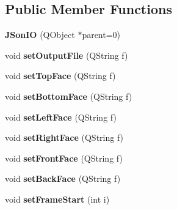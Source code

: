\subsection*{\-Public \-Member \-Functions}
\begin{DoxyCompactItemize}
\item 
\hypertarget{class_j_son_i_o_a79e07c1b5210823a0758985d6a413ed1}{
{\bfseries \-J\-Son\-I\-O} (\-Q\-Object $\ast$parent=0)}
\label{class_j_son_i_o_a79e07c1b5210823a0758985d6a413ed1}

\item 
\hypertarget{class_j_son_i_o_a0d32b7f22a5e9f783587eabccee73ef2}{
void {\bfseries set\-Output\-File} (\-Q\-String f)}
\label{class_j_son_i_o_a0d32b7f22a5e9f783587eabccee73ef2}

\item 
\hypertarget{class_j_son_i_o_a828e68664107576d4d0b2f3046d77e48}{
void {\bfseries set\-Top\-Face} (\-Q\-String f)}
\label{class_j_son_i_o_a828e68664107576d4d0b2f3046d77e48}

\item 
\hypertarget{class_j_son_i_o_a5f01c06bd06dfcdcc60bc112667ffc6a}{
void {\bfseries set\-Bottom\-Face} (\-Q\-String f)}
\label{class_j_son_i_o_a5f01c06bd06dfcdcc60bc112667ffc6a}

\item 
\hypertarget{class_j_son_i_o_a0432e74865fe7b6b58f8b670ecfbce82}{
void {\bfseries set\-Left\-Face} (\-Q\-String f)}
\label{class_j_son_i_o_a0432e74865fe7b6b58f8b670ecfbce82}

\item 
\hypertarget{class_j_son_i_o_a0691c7aafa6a024610be7def11c4e092}{
void {\bfseries set\-Right\-Face} (\-Q\-String f)}
\label{class_j_son_i_o_a0691c7aafa6a024610be7def11c4e092}

\item 
\hypertarget{class_j_son_i_o_a256be2d75f459a6ac853563e371eba31}{
void {\bfseries set\-Front\-Face} (\-Q\-String f)}
\label{class_j_son_i_o_a256be2d75f459a6ac853563e371eba31}

\item 
\hypertarget{class_j_son_i_o_a8e2147a6ddc73e83e3a3717a5efc5106}{
void {\bfseries set\-Back\-Face} (\-Q\-String f)}
\label{class_j_son_i_o_a8e2147a6ddc73e83e3a3717a5efc5106}

\item 
\hypertarget{class_j_son_i_o_a2fa2aaf57801e30b004656202fa123d1}{
void {\bfseries set\-Frame\-Start} (int i)}
\label{class_j_son_i_o_a2fa2aaf57801e30b004656202fa123d1}


\end{DoxyCompactItemize}
